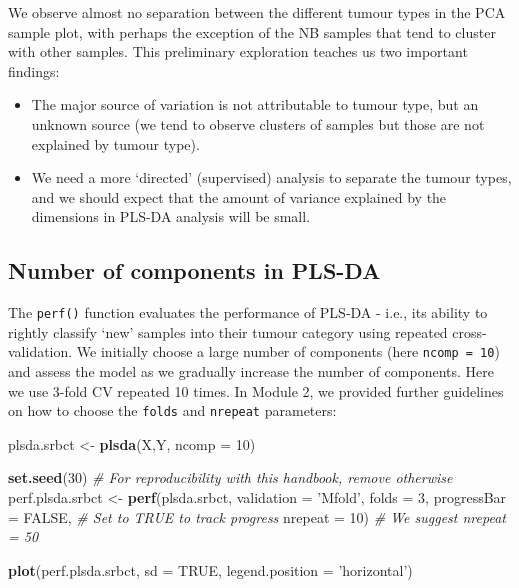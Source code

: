 \documentclass[]{book}
\newenvironment{Shaded}{\begin{snugshade}}{\end{snugshade}}
\newcommand{\KeywordTok}[1]{\textcolor[rgb]{0.13,0.29,0.53}{\textbf{#1}}}
\newcommand{\DataTypeTok}[1]{\textcolor[rgb]{0.13,0.29,0.53}{#1}}
\newcommand{\DecValTok}[1]{\textcolor[rgb]{0.00,0.00,0.81}{#1}}
\newcommand{\StringTok}[1]{\textcolor[rgb]{0.31,0.60,0.02}{#1}}
\newcommand{\CommentTok}[1]{\textcolor[rgb]{0.56,0.35,0.01}{\textit{#1}}}
\newcommand{\OtherTok}[1]{\textcolor[rgb]{0.56,0.35,0.01}{#1}}
\newcommand{\NormalTok}[1]{#1}
\providecommand{\tightlist}{%
  \setlength{\itemsep}{0pt}\setlength{\parskip}{0pt}}
\begin{document}
We observe almost no separation between the different tumour types in
the PCA sample plot, with perhaps the exception of the NB samples that
tend to cluster with other samples. This preliminary exploration teaches
us two important findings:

\begin{itemize}
\tightlist
\item
  The major source of variation is not attributable to tumour type, but
  an unknown source (we tend to observe clusters of samples but those
  are not explained by tumour type).
\item
  We need a more `directed' (supervised) analysis to separate the tumour
  types, and we should expect that the amount of variance explained by
  the dimensions in PLS-DA analysis will be small.
\end{itemize}

\subsection{Number of components in
PLS-DA}\label{number-of-components-in-pls-da}

The \texttt{perf()} function evaluates the performance of PLS-DA - i.e.,
its ability to rightly classify `new' samples into their tumour category
using repeated cross-validation. We initially choose a large number of
components (here \texttt{ncomp\ =\ 10}) and assess the model as we
gradually increase the number of components. Here we use 3-fold CV
repeated 10 times. In Module 2, we provided further guidelines on how to
choose the \texttt{folds} and \texttt{nrepeat} parameters:

\begin{Shaded}
\begin{Highlighting}[]
\NormalTok{plsda.srbct <-}\StringTok{ }\KeywordTok{plsda}\NormalTok{(X,Y, }\DataTypeTok{ncomp =} \DecValTok{10}\NormalTok{)}

\KeywordTok{set.seed}\NormalTok{(}\DecValTok{30}\NormalTok{) }\CommentTok{# For reproducibility with this handbook, remove otherwise}
\NormalTok{perf.plsda.srbct <-}\StringTok{ }\KeywordTok{perf}\NormalTok{(plsda.srbct, }\DataTypeTok{validation =} \StringTok{'Mfold'}\NormalTok{, }\DataTypeTok{folds =} \DecValTok{3}\NormalTok{, }
                  \DataTypeTok{progressBar =} \OtherTok{FALSE}\NormalTok{,  }\CommentTok{# Set to TRUE to track progress}
                  \DataTypeTok{nrepeat =} \DecValTok{10}\NormalTok{)         }\CommentTok{# We suggest nrepeat = 50}

\KeywordTok{plot}\NormalTok{(perf.plsda.srbct, }\DataTypeTok{sd =} \OtherTok{TRUE}\NormalTok{, }\DataTypeTok{legend.position =} \StringTok{'horizontal'}\NormalTok{)}
\end{Highlighting}
\end{Shaded}
\end{document}
